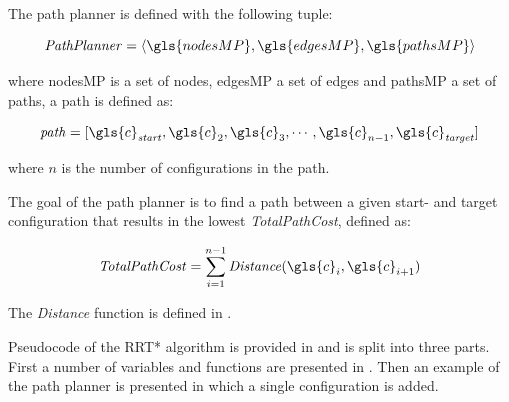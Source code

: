 \textit{}\bs

The path planner is defined with the following tuple:

\[\mathit{Path Planner} = \left\langle \gls{nodesMP}, \gls{edgesMP}, \gls{pathsMP}\right\rangle\]

where \gls{nodesMP} is a set of nodes, \gls{edgesMP} a set of edges and \gls{pathsMP} a set of paths, a path is defined as:

\[\mathit{path} = [\gls{c}_\mathit{start}, \gls{c}_2, \gls{c}_3, \cdots, \gls{c}_{n-1}, \gls{c}_\mathit{target}]\]

where $n$ is the number of configurations in the path.\bs

The goal of the path planner is to find a path between a given start- and target configuration that results in the lowest \textit{TotalPathCost}, defined as:\bs

\[\mathit{TotalPathCost} = \sum_{i=1}^{n-1} \mathit{Distance}(\gls{c}_i, \gls{c}_{i+1})\]

The \textit{Distance} function is defined in .\bs

Pseudocode of the \ac{RRT*} algorithm is provided in  and is split into three parts. First a number of variables and functions are presented in . Then an example of the path planner is presented in which a single configuration is added.\bs

